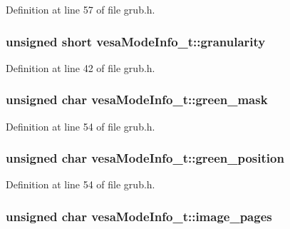 Definition at line 57 of file grub.\+h.

\hypertarget{structvesaModeInfo__t_a59708e15ac9929ad9218b4ef25f4e861}{
\subsubsection[{granularity}]{\setlength{\rightskip}{0pt plus 5cm}unsigned short vesa\+Mode\+Info\+\_\+t\+::granularity}}\label{structvesaModeInfo__t_a59708e15ac9929ad9218b4ef25f4e861}


Definition at line 42 of file grub.\+h.

\hypertarget{structvesaModeInfo__t_a00414463a3873e70cc7418f109b35f06}{
\subsubsection[{green\+\_\+mask}]{\setlength{\rightskip}{0pt plus 5cm}unsigned char vesa\+Mode\+Info\+\_\+t\+::green\+\_\+mask}}\label{structvesaModeInfo__t_a00414463a3873e70cc7418f109b35f06}


Definition at line 54 of file grub.\+h.

\hypertarget{structvesaModeInfo__t_ac5e0330302132e9423fa856f26a34286}{
\subsubsection[{green\+\_\+position}]{\setlength{\rightskip}{0pt plus 5cm}unsigned char vesa\+Mode\+Info\+\_\+t\+::green\+\_\+position}}\label{structvesaModeInfo__t_ac5e0330302132e9423fa856f26a34286}


Definition at line 54 of file grub.\+h.

\hypertarget{structvesaModeInfo__t_a072aebfd294ef7c940917ad1f5d53176}{
\subsubsection[{image\+\_\+pages}]{\setlength{\rightskip}{0pt plus 5cm}unsigned char vesa\+Mode\+Info\+\_\+t\+::image\+\_\+pages}}\label{structvesaModeInfo__t_a072aebfd294ef7c940917ad1f5d53176}


